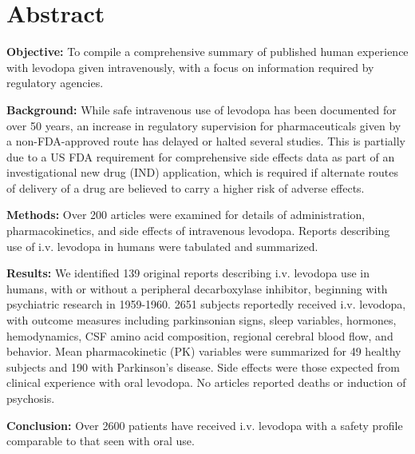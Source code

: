 \section{Abstract}
\textbf{Objective:} To compile a comprehensive summary of published human experience with levodopa given intravenously, with a focus on information required by regulatory agencies.

\textbf{Background:} While safe intravenous use of levodopa has been documented for over 50 years, an increase in regulatory supervision for pharmaceuticals given by a non-FDA-approved route has delayed or halted several studies. This is partially due to a US FDA requirement for comprehensive side effects data as part of an investigational new drug (IND) application, which is required if alternate routes of delivery of a drug are believed to carry a higher risk of adverse effects.

\textbf{Methods:} Over 200 articles were examined for details of administration, pharmacokinetics, and side effects of intravenous levodopa. Reports describing use of i.v. levodopa in humans were tabulated and summarized.

\textbf{Results:} We identiﬁed 139 original reports describing i.v. levodopa use in humans, with or without a peripheral decarboxylase inhibitor, beginning with psychiatric research in 1959-1960. 2651 subjects reportedly received i.v. levodopa, with outcome measures including parkinsonian signs, sleep variables, hormones, hemodynamics, CSF amino acid composition, regional cerebral blood ﬂow, and behavior. Mean pharmacokinetic (PK) variables were summarized for 49 healthy subjects and 190 with Parkinson's disease. Side effects were those expected from clinical experience with oral levodopa. No articles reported deaths or induction of psychosis.

\textbf{Conclusion:} Over 2600 patients have received i.v. levodopa with a safety profile comparable to that seen with oral use.
